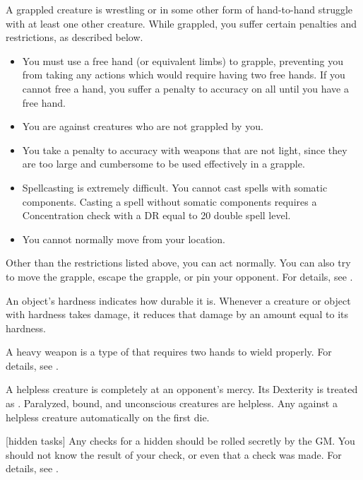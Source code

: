  A grappled creature is wrestling or in some other form of hand-to-hand struggle with at least one other creature.
While grappled, you suffer certain penalties and restrictions, as described below.
\begin{itemize}
    \item You must use a free hand (or equivalent limbs) to grapple, preventing you from taking any actions which would require having two free hands.
        If you cannot free a hand, you suffer a  penalty to accuracy on all  until you have a free hand.
    \item You are  against creatures who are not grappled by you.
    \item You take a  penalty to accuracy with weapons that are not light, since they are too large and cumbersome to be used effectively in a grapple.
    \item Spellcasting is extremely difficult. You cannot cast spells with somatic components.
        Casting a spell without somatic components requires a Concentration check with a DR equal to 20 \add double spell level.
    \item You cannot normally move from your location. 
\end{itemize}

Other than the restrictions listed above, you can act normally. You can also try to move the grapple, escape the grapple, or pin your opponent. For details, see .

 An object's hardness indicates how durable it is.
Whenever a creature or object with hardness takes damage, it reduces that damage by an amount equal to its hardness.

 A heavy weapon is a type of  that requires two hands to wield properly.
For details, see .

 A helpless creature is completely at an opponent's mercy.
Its Dexterity is treated as .
Paralyzed, bound, and unconscious creatures are helpless.
Any  against a helpless creature automatically  on the first die.

[hidden tasks] Any checks for a hidden  should be rolled secretly by the GM.\@
You should not know the result of your check, or even that a check was made.
For details, see .

